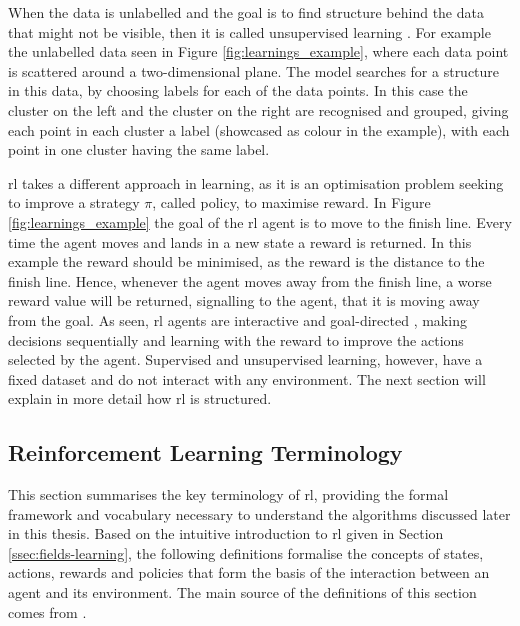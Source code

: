 When the data is unlabelled and the goal is to find structure behind the data that might not be visible, then it is called unsupervised learning \cite{rl_introduction}. For example the unlabelled data seen in Figure \ref{fig:learnings_example}, where each data point is scattered around a two-dimensional plane. The model searches for a structure in this data, by choosing labels for each of the data points. In this case the cluster on the left and the cluster on the right are recognised and grouped, giving each point in each cluster a label (showcased as colour in the example), with each point in one cluster having the same label.

\ac{rl} takes a different approach in learning, as it is an optimisation problem seeking to improve a strategy $\pi$, called policy, to maximise reward. In Figure \ref{fig:learnings_example} the goal of the \ac{rl} agent is to move to the finish line. Every time the agent moves and lands in a new state a reward is returned. In this example the reward should be minimised, as the reward is the distance to the finish line. Hence, whenever the agent moves away from the finish line, a worse reward value will be returned, signalling to the agent, that it is moving away from the goal. As seen, \ac{rl} agents are interactive and goal-directed \cite{rl_introduction}, making decisions sequentially and learning with the reward to improve the actions selected by the agent. Supervised and unsupervised learning, however, have a fixed dataset and do not interact with any environment. The next section will explain in more detail how \ac{rl} is structured.


\subsection{Reinforcement Learning Terminology}\label{ssec:rl-terminology}
This section summarises the key terminology of \ac{rl}, providing the formal framework and vocabulary necessary to understand the algorithms discussed later in this thesis. Based on the intuitive introduction to \ac{rl} given in Section \ref{ssec:fields-learning}, the following definitions formalise the concepts of states, actions, rewards and policies that form the basis of the interaction between an agent and its environment. The main source of the definitions of this section comes from \citet{rl_introduction}.

